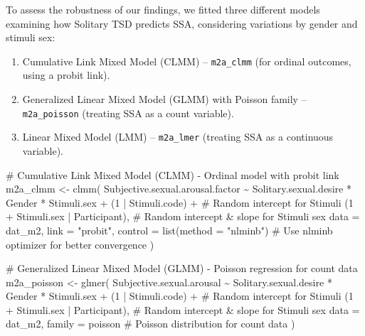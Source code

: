 \documentclass[
  bookmarksnumbered]{article}
\newenvironment{Shaded}{\begin{snugshade}}{\end{snugshade}}
\newcommand{\AttributeTok}[1]{\textcolor[rgb]{0.80,0.80,0.80}{#1}}
\newcommand{\CommentTok}[1]{\textcolor[rgb]{0.50,0.62,0.50}{#1}}
\newcommand{\DecValTok}[1]{\textcolor[rgb]{0.86,0.86,0.80}{#1}}
\newcommand{\FunctionTok}[1]{\textcolor[rgb]{0.94,0.94,0.56}{#1}}
\newcommand{\NormalTok}[1]{\textcolor[rgb]{0.80,0.80,0.80}{#1}}
\newcommand{\OtherTok}[1]{\textcolor[rgb]{0.94,0.94,0.56}{#1}}
\newcommand{\SpecialCharTok}[1]{\textcolor[rgb]{0.86,0.64,0.64}{#1}}
\newcommand{\StringTok}[1]{\textcolor[rgb]{0.80,0.58,0.58}{#1}}
\providecommand{\tightlist}{%
  \setlength{\itemsep}{0pt}\setlength{\parskip}{0pt}}
\begin{document}
To assess the robustness of our findings, we fitted three different models examining how Solitary TSD predicts SSA, considering variations by gender and stimuli sex:

\begin{enumerate}
\def\labelenumi{\arabic{enumi}.}
\tightlist
\item
  Cumulative Link Mixed Model (CLMM) -- \texttt{m2a\_clmm} (for ordinal outcomes, using a probit link).
\item
  Generalized Linear Mixed Model (GLMM) with Poisson family -- \texttt{m2a\_poisson} (treating SSA as a count variable).
\item
  Linear Mixed Model (LMM) -- \texttt{m2a\_lmer} (treating SSA as a continuous variable).
\end{enumerate}

\begin{Shaded}
\begin{Highlighting}[]
\CommentTok{\# Cumulative Link Mixed Model (CLMM) {-} Ordinal model with probit link}
\NormalTok{m2a\_clmm }\OtherTok{\textless{}{-}} \FunctionTok{clmm}\NormalTok{(}
\NormalTok{  Subjective.sexual.arousal.factor }\SpecialCharTok{\textasciitilde{}}\NormalTok{ Solitary.sexual.desire }\SpecialCharTok{*}\NormalTok{ Gender }\SpecialCharTok{*}\NormalTok{ Stimuli.sex }\SpecialCharTok{+}
\NormalTok{    (}\DecValTok{1} \SpecialCharTok{|}\NormalTok{ Stimuli.code) }\SpecialCharTok{+} \CommentTok{\# Random intercept for Stimuli}
\NormalTok{    (}\DecValTok{1} \SpecialCharTok{+}\NormalTok{ Stimuli.sex }\SpecialCharTok{|}\NormalTok{ Participant), }\CommentTok{\# Random intercept \& slope for Stimuli sex}
  \AttributeTok{data =}\NormalTok{ dat\_m2,}
  \AttributeTok{link =} \StringTok{"probit"}\NormalTok{,}
  \AttributeTok{control =} \FunctionTok{list}\NormalTok{(}\AttributeTok{method =} \StringTok{"nlminb"}\NormalTok{) }\CommentTok{\# Use \textquotesingle{}nlminb\textquotesingle{} optimizer for better convergence}
\NormalTok{)}

\CommentTok{\# Generalized Linear Mixed Model (GLMM) {-} Poisson regression for count data}
\NormalTok{m2a\_poisson }\OtherTok{\textless{}{-}} \FunctionTok{glmer}\NormalTok{(}
\NormalTok{  Subjective.sexual.arousal }\SpecialCharTok{\textasciitilde{}}\NormalTok{ Solitary.sexual.desire }\SpecialCharTok{*}\NormalTok{ Gender }\SpecialCharTok{*}\NormalTok{ Stimuli.sex }\SpecialCharTok{+}
\NormalTok{    (}\DecValTok{1} \SpecialCharTok{|}\NormalTok{ Stimuli.code) }\SpecialCharTok{+} \CommentTok{\# Random intercept for Stimuli}
\NormalTok{    (}\DecValTok{1} \SpecialCharTok{+}\NormalTok{ Stimuli.sex }\SpecialCharTok{|}\NormalTok{ Participant), }\CommentTok{\# Random intercept \& slope for Stimuli sex}
  \AttributeTok{data =}\NormalTok{ dat\_m2,}
  \AttributeTok{family =}\NormalTok{ poisson }\CommentTok{\# Poisson distribution for count data}
\NormalTok{)}


\end{Highlighting}
\end{Shaded}
\end{document}
